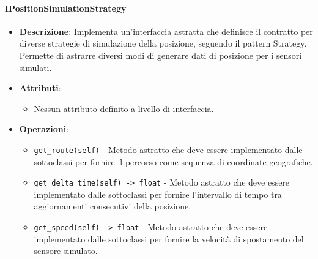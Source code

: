 \documentclass[10pt]{article}
\begin{document}
    \paragraph{IPositionSimulationStrategy}
    \begin{itemize} 
    \item \textbf{Descrizione}: Implementa un'interfaccia astratta che definisce il contratto per diverse strategie di simulazione della posizione, seguendo il pattern Strategy. Permette di astrarre diversi modi di generare dati di posizione per i sensori simulati.
    \item \textbf{Attributi}:
    \begin{itemize}
        \item Nessun attributo definito a livello di interfaccia.
    \end{itemize}
    
    \item \textbf{Operazioni}:
    \begin{itemize}
        \item \texttt{get\_route(self)} - Metodo astratto che deve essere implementato dalle sottoclassi per fornire il percorso come sequenza di coordinate geografiche.
        
        \item \texttt{get\_delta\_time(self) -> float} - Metodo astratto che deve essere implementato dalle sottoclassi per fornire l'intervallo di tempo tra aggiornamenti consecutivi della posizione.
        
        \item \texttt{get\_speed(self) -> float} - Metodo astratto che deve essere implementato dalle sottoclassi per fornire la velocità di spostamento del sensore simulato.
    \end{itemize}
    \end{itemize}
\end{document}
